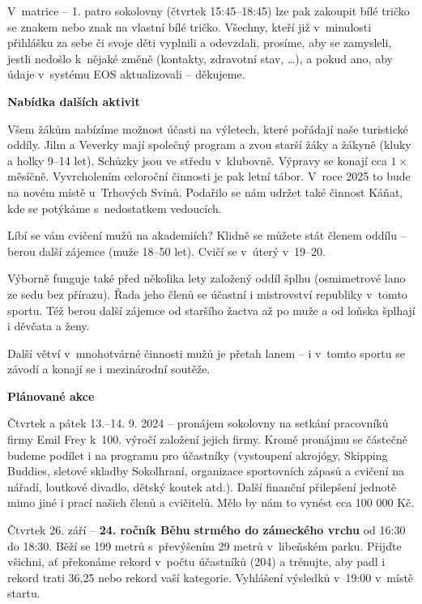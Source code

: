 \documentclass[11pt]{article}
\begin{document}
V~matrice – 1. patro sokolovny (čtvrtek 15:45–18:45) lze pak zakoupit bílé tričko se znakem nebo znak na vlastní bílé tričko. Všechny, kteří již v~minulosti přihlášku za sebe či svoje děti vyplnili a odevzdali, prosíme, aby se zamysleli, jestli nedošlo k~nějaké změně (kontakty, zdravotní stav, \ldots), a pokud ano, aby údaje v~systému EOS aktualizovali – děkujeme.

\vspace*{12pt}
\begin{center}
  \noindent\textbf{Nabídka dalších aktivit}
\end{center}
\vspace*{6pt}
Všem žákům nabízíme možnost účasti na výletech, které pořádají naše turistické oddíly. Jilm a Veverky mají společný program a zvou starší žáky a žákyně (kluky a holky 9–14 let). Schůzky jsou ve středu v~klubovně. Výpravy se konají cca $1\times$ měsíčně. Vyvrcholením celoroční činnosti je pak letní tábor. V~roce 2025 to bude na novém místě u~Trhových Svinů. Podařilo se nám udržet také činnost Káňat, kde se potýkáme s~nedostatkem vedoucích.

Líbí se vám cvičení mužů na akademiích? Klidně se můžete stát členem oddílu – berou další zájemce (muže 18–50 let). Cvičí se v~úterý v~19–20. 

Výborně funguje také před několika lety založený oddíl šplhu (osmimetrové lano ze sedu bez přírazu). Řada jeho členů se účastní i mistrovství republiky v~tomto sportu. Též berou další zájemce od staršího žactva až po muže a od loňska šplhají i děvčata a ženy. 

Další větví v~mnohotvárné činnosti mužů je přetah lanem – i v~tomto sportu se závodí a konají se i mezinárodní soutěže. 

\vspace*{12pt}
\begin{center}
  \noindent\textbf{Plánované akce}
\end{center}
\vspace*{6pt}
Čtvrtek a pátek 13.–14. 9. 2024 – pronájem sokolovny na setkání pracovníků firmy Emil Frey k~100. výročí založení jejich firmy. Kromě pronájmu se částečně budeme podílet i na programu pro účastníky (vystoupení akrojógy, Skipping Buddies, sletové skladby Sokolhraní, organizace sportovních zápasů a cvičení na nářadí, loutkové divadlo, dětský koutek atd.). Další finanční přilepšení jednotě mimo jiné i prací našich členů a cvičitelů. Mělo by nám to vynést cca 100 000 Kč.   

Čtvrtek 26. září – \textbf{24. ročník Běhu strmého do zámeckého vrchu} od 16:30 do 18:30. Běží se 199 metrů s~převýšením 29 metrů v~libeňském parku. Přijďte všichni, ať překonáme rekord v~počtu účastníků (204) a trénujte, aby padl i rekord trati 36,25 nebo rekord vaší kategorie. Vyhlášení výsledků v~19:00 v~místě startu. 
\end{document}
